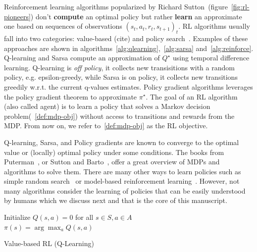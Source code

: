 Reinforcement learning algorithms popularized by Richard Sutton~\cite{sutton}(figure~\ref{fig:rl-pioneers}) don't \textbf{compute} an optimal policy but rather \textbf{learn} an approximate one based on sequences of observations ${(s_t, a_t, r_t, s_{t+1})}_t$.
RL algorithms usually fall into two categories: value-based (cite) and policy search~\cite{pg_sutton}.
Examples of these approaches are shown in algorithms~\ref{alg:qlearning},~\ref{alg:sarsa} and~\ref{alg:reinforce}.
Q-learning and Sarsa compute an approximation of $Q^{\star}$ using temporal difference learning. Q-learning is \textit{off policy}, it collects new transisitions with a random policy, e.g. epsilon-greedy, while Sarsa is on policy, it collects new transitions greedily w.r.t. the current q-values estimates.
Policy gradient algorithms leverages the policy gradient theorem to approximate $\pi^{\star}$.
The goal of an RL algorithm (also called agent) is to learn a policy that solves a Markov decision problem(~\ref{def:mdp-obj}) without access to transitions and rewards from the MDP.
From now on, we refer to~\ref{def:mdp-obj} as the RL objective.

Q-learning, Sarsa, and Policy gradients are known to converge to the optimal value or (locally) optimal policy under some conditions.
The books from Puterman~\cite{puterman}, or Sutton and Barto~\cite{sutton}, offer a great overview of MDPs and algorithms to solve them.
There are many other ways to learn policies such as simple random search~\cite{random-search} or model-based reinforcement learning~\cite{dyna}. 
However, not many algorithms consider the learning of policies that can be easily understood by humans which we discuss next and that is the core of this manuscript.

\begin{algorithm}
    Initialize $Q(s,a) = 0$ for all $s \in S, a \in A$ \\
    $\pi(s) = \arg\max_a Q(s,a)$ 
    \caption{Value-based RL (Q-Learning)}\label{alg:qlearning}
\end{algorithm}


